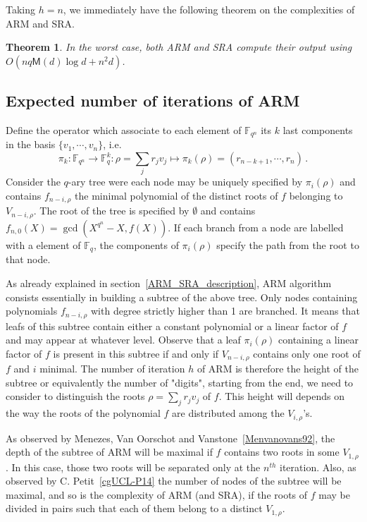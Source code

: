 \documentclass{sig-alternate}
\newcommand{\ff}[1]{\mathbb{F}_{#1}}
\newcommand{\qq}{q}
\newcommand{\nn}{n}
\newcommand{\qn}{{\qq^\nn}}
\newcommand{\basef}{\ff{\qq}}
\newcommand{\extf}{\ff{\qn}}
\newcommand{\Mul}{\mathsf{M}}
\newcounter{algo}
\newtheorem{Theo}{Theorem}
\begin{document}
 Taking $h=n$, we immediately have the following theorem on the
 complexities of ARM and SRA.

 \begin{Theo}
   In the worst case, both ARM and SRA compute their output using
   $O(nq\Mul(d)\log d + n^2d)$.
 \end{Theo}



\subsection{Expected number of iterations of ARM}

Define the operator which associate to each element of $\extf$ its $k$ last components in the basis $\{v_1, \cdots, v_n\}$, i.e. 
$$\pi_k:\extf \rightarrow \mathbb{F}_{\qq}^{k}: \rho=\sum_j r_j v_j \mapsto \pi_k(\rho)=(r_{n-k+1}, \cdots , r_n)\,.$$
Consider the $\qq$-ary tree were each node may be uniquely specified by $\pi_i(\rho)$ and contains $f_{n-i,\rho}$ the minimal polynomial of the distinct roots of $f$ belonging to $V_{n-i,\rho}$. The root of the tree is specified by $\emptyset$ and contains $f_{n,0}(X)=\gcd(X^{\qq^\nn} -X,f(X))$. If each branch from a node are labelled with a element of $\basef$, the components of $\pi_i(\rho)$ specify the path from the root to that node.

As already explained in section~\ref{ARM_SRA_description}, ARM algorithm consists essentially in building a subtree of the above tree.  Only nodes containing polynomials 
$f_{n-i,\rho}$ with degree strictly higher than 1 are branched. It means that leafs of this subtree contain either a constant polynomial or a linear factor of $f$ and may appear at whatever level. Observe that a leaf $\pi_i(\rho)$ containing a linear factor of $f$ is present in this subtree if and only if $V_{n-i,\rho}$ contains only one root of $f$ and $i$ minimal.
 The number of iteration $h$ of ARM is therefore the height of the subtree or equivalently the number of "digits", starting from the end, we need to consider to distinguish the roots $\rho=\sum_j r_j v_j$  of $f$. This height will depends on the way the roots of the polynomial $f$ are distributed among the $V_{i,\rho}$'s.
 
\medskip 
 
 As observed by Menezes, Van Oorschot and Vanstone~\ref{Menvanovans92}, the depth of the subtree of ARM will be maximal if $f$ contains two roots in some $V_{1,\rho}$. In this case, those two roots will be separated only at the $\nn^{th}$ iteration. Also, as observed by C. Petit~\ref{cgUCL-P14} the number of nodes of the subtree will be maximal, and so is the complexity of ARM (and SRA), if the roots of $f$ may be divided in pairs such that each of them belong to a distinct $V_{1,\rho}$. 
 
\end{document}
